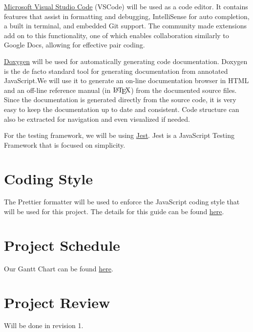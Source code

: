 \documentclass{article}
\begin{document}
\bigskip
\href{https://code.visualstudio.com/}{Microsoft Visual Studio Code} (VSCode) will be used as a code editor. It contains features that assist in formatting and debugging, IntelliSense for auto completion, a built in terminal, and embedded Git support. The community made extensions add on to this functionality, one of which enables collaboration similarly to Google Docs, allowing for effective pair coding.

\bigskip
\href{https://www.doxygen.nl/index.html}{Doxygen} will be used for automatically generating code documentation. Doxygen is the de facto standard tool for generating documentation from annotated JavaScript.We will use it to generate an on-line documentation browser in HTML and an off-line reference manual (in $\mbox{\LaTeX}$) from the documented source files. Since the documentation is generated directly from the source code, it is very easy to keep the documentation up to date and consistent. Code structure can also be extracted for navigation and even visualized if needed.
\bigskip

For the testing framework, we will be using \href{https://jestjs.io/en/}{Jest}. Jest is a JavaScript Testing Framework that is focused on simplicity.
\bigskip
\section{Coding Style}
The Prettier formatter will be used to enforce the JavaScript coding style that will be used for this project.  The details for this guide can be found \href{https://firefox-source-docs.mozilla.org/code-quality/coding-style/coding_style_js.html}{here}. 
\section{Project Schedule}

Our Gantt Chart can be found \href{https://gitlab.cas.mcmaster.ca/carriedd/Tetris_Tussle/-/tree/master/ProjectSchedule}{here}. 


\section{Project Review}
Will be done in revision 1.
\end{document}
